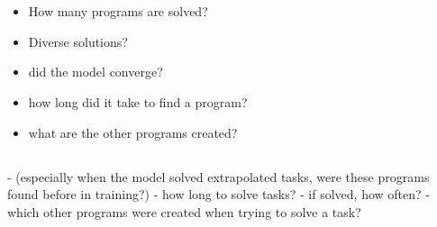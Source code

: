 \section{}

\subsection{}
\begin{itemize}
    \item How many programs are solved?
    \item Diverse solutions?
    \item did the model converge? 
    \item how long did it take to find a program?
    \item what are the other programs created?
\end{itemize}




\subsection{}
- (especially when the model solved extrapolated tasks, were these programs found before in training?)
- how long to solve tasks? 
- if solved, how often?
- which other programs were created when trying to solve a task?

